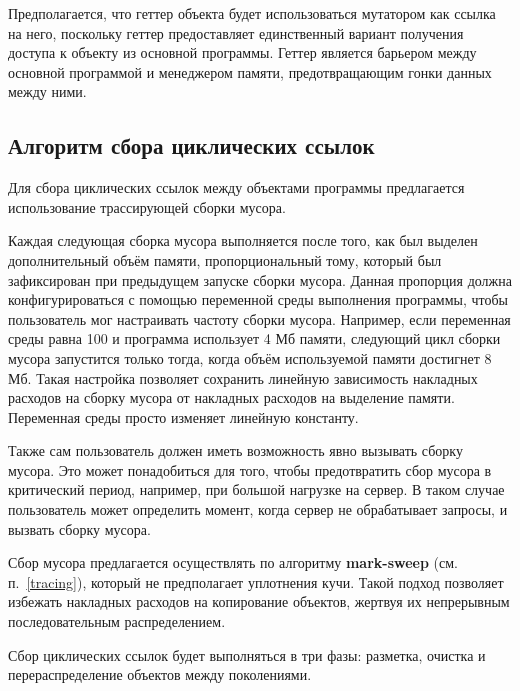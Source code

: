 Предполагается, что геттер объекта будет использоваться мутатором как ссылка на него, поскольку геттер предоставляет единственный вариант получения доступа к объекту из основной программы. Геттер является барьером между основной программой и менеджером памяти, предотвращающим гонки данных между ними.



\subsection{Алгоритм сбора циклических ссылок}

Для сбора циклических ссылок между объектами программы предлагается использование трассирующей сборки мусора.

Каждая следующая сборка мусора выполняется после того, как был выделен дополнительный объём памяти, пропорциональный тому, который был зафиксирован при предыдущем запуске сборки мусора. Данная пропорция должна конфигурироваться с помощью переменной среды выполнения программы, чтобы пользователь мог настраивать частоту сборки мусора. Например, если переменная среды равна 100 и программа использует 4 Мб памяти, следующий цикл сборки мусора запустится только тогда, когда объём используемой памяти достигнет 8 Мб. Такая настройка позволяет сохранить линейную зависимость накладных расходов на сборку мусора от накладных расходов на выделение памяти. Переменная среды просто изменяет линейную константу.

Также сам пользователь должен иметь возможность явно вызывать сборку мусора. Это может понадобиться для того, чтобы предотвратить сбор мусора в критический период, например, при большой нагрузке на сервер. В таком случае пользователь может определить момент, когда сервер не обрабатывает запросы, и вызвать сборку мусора.

Сбор мусора предлагается осуществлять по алгоритму \textbf{mark-sweep} (см. п.~\ref{tracing}), который не предполагает уплотнения кучи. Такой подход позволяет избежать накладных расходов на копирование объектов, жертвуя их непрерывным последовательным распределением.

Сбор циклических ссылок будет выполняться в три фазы: разметка, очистка и перераспределение объектов между поколениями.

